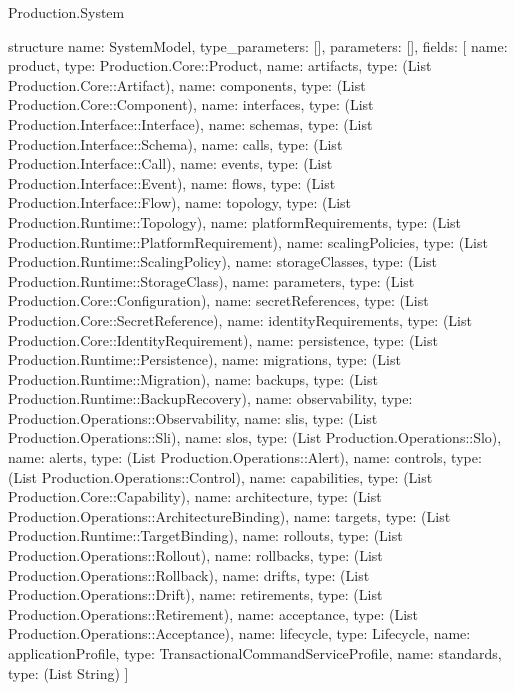 \begin{lexlean}{Production.System}
\begin{semanticmodule}
structure{
  name: SystemModel,
  type_parameters: [],
  parameters: [],
  fields: [
    {name: product, type: Production.Core::Product},
    {name: artifacts, type: (List Production.Core::Artifact)},
    {name: components, type: (List Production.Core::Component)},
    {name: interfaces, type: (List Production.Interface::Interface)},
    {name: schemas, type: (List Production.Interface::Schema)},
    {name: calls, type: (List Production.Interface::Call)},
    {name: events, type: (List Production.Interface::Event)},
    {name: flows, type: (List Production.Interface::Flow)},
    {name: topology, type: (List Production.Runtime::Topology)},
    {name: platformRequirements, type: (List Production.Runtime::PlatformRequirement)},
    {name: scalingPolicies, type: (List Production.Runtime::ScalingPolicy)},
    {name: storageClasses, type: (List Production.Runtime::StorageClass)},
    {name: parameters, type: (List Production.Core::Configuration)},
    {name: secretReferences, type: (List Production.Core::SecretReference)},
    {name: identityRequirements, type: (List Production.Core::IdentityRequirement)},
    {name: persistence, type: (List Production.Runtime::Persistence)},
    {name: migrations, type: (List Production.Runtime::Migration)},
    {name: backups, type: (List Production.Runtime::BackupRecovery)},
    {name: observability, type: Production.Operations::Observability},
    {name: slis, type: (List Production.Operations::Sli)},
    {name: slos, type: (List Production.Operations::Slo)},
    {name: alerts, type: (List Production.Operations::Alert)},
    {name: controls, type: (List Production.Operations::Control)},
    {name: capabilities, type: (List Production.Core::Capability)},
    {name: architecture, type: (List Production.Operations::ArchitectureBinding)},
    {name: targets, type: (List Production.Runtime::TargetBinding)},
    {name: rollouts, type: (List Production.Operations::Rollout)},
    {name: rollbacks, type: (List Production.Operations::Rollback)},
    {name: drifts, type: (List Production.Operations::Drift)},
    {name: retirements, type: (List Production.Operations::Retirement)},
    {name: acceptance, type: (List Production.Operations::Acceptance)},
    {name: lifecycle, type: Lifecycle},
    {name: applicationProfile, type: TransactionalCommandServiceProfile},
    {name: standards, type: (List String)}
  ]
}


\end{semanticmodule}
\end{lexlean}
